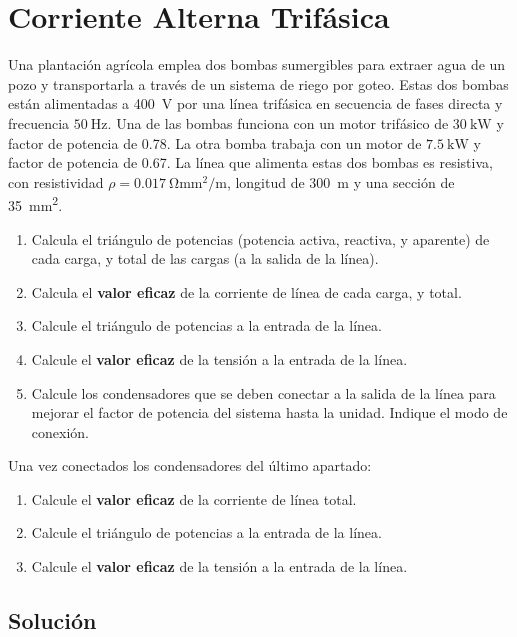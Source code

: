 \documentclass[10pt]{article}
\begin{document}
\clearpage
\section*{Corriente Alterna Trifásica}

Una plantación agrícola emplea dos bombas sumergibles para extraer
agua de un pozo y transportarla a través de un sistema de riego por
goteo. Estas dos bombas están alimentadas a \SI{400}{\volt} por una
línea trifásica en secuencia de fases directa y frecuencia
$\SI{50}{\hertz}$. Una de las bombas funciona con un motor trifásico
de $\SI{30}{\kilo\watt}$ y factor de potencia de 0.78. La otra bomba
trabaja con un motor de $\SI{7.5}{\kilo\watt}$ y factor de potencia de
0.67.  La línea que alimenta estas dos bombas es resistiva, con
resistividad $\rho = \SI{0.017}{\ohm\milli\meter\squared\per\meter}$,
longitud de \SI{300}{m} y una sección de
\SI{35}{\milli\meter\squared}.
 
\begin{enumerate}
\item Calcula el triángulo de potencias (potencia activa, reactiva, y
  aparente) de cada carga, y total de las cargas (a la salida de la
  línea).
\item Calcula el \textbf{valor eficaz} de la corriente de línea de
  cada carga, y total.
\item Calcule el triángulo de potencias a la entrada de la línea.
\item Calcule el \textbf{valor eficaz} de la tensión a la entrada de
  la línea.
\item Calcule los condensadores que se deben conectar a la salida de
  la línea para mejorar el factor de potencia del sistema hasta la
  unidad. Indique el modo de conexión.
\end{enumerate}

Una vez conectados los condensadores del último apartado:
\begin{enumerate}[resume]
\item Calcule el \textbf{valor eficaz} de la corriente de línea total.
\item Calcule el triángulo de potencias a la entrada de la línea.
\item Calcule el \textbf{valor eficaz} de la tensión a la entrada de
  la línea.
\end{enumerate}

\subsection*{Solución}
\end{document}
